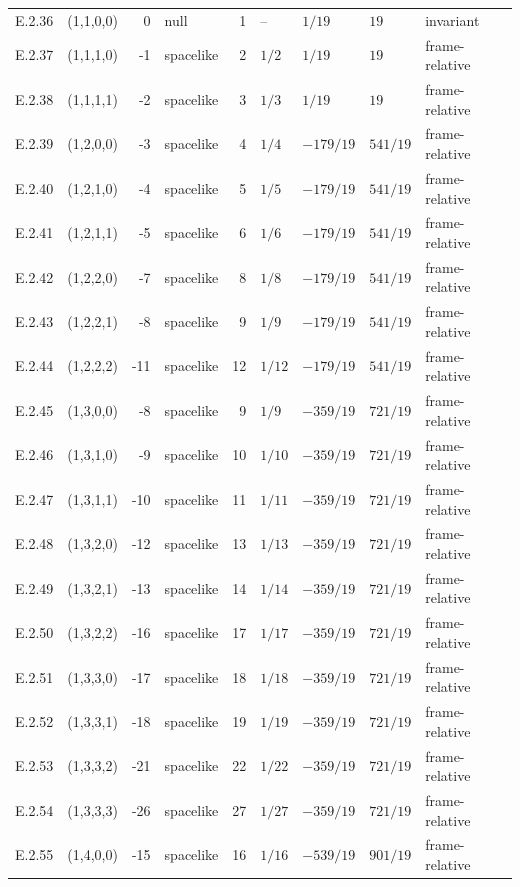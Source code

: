 {\begin{longtable}{@{}llrlrllll@{}}
E.2.36 & (1,1,0,0) & 0 & null & 1 & -- & $1/19$ & $19$ & invariant \\
E.2.37 & (1,1,1,0) & -1 & spacelike & 2 & $1/2$ & $1/19$ & $19$ & frame-relative \\
E.2.38 & (1,1,1,1) & -2 & spacelike & 3 & $1/3$ & $1/19$ & $19$ & frame-relative \\
E.2.39 & (1,2,0,0) & -3 & spacelike & 4 & $1/4$ & $-179/19$ & $541/19$ & frame-relative \\
E.2.40 & (1,2,1,0) & -4 & spacelike & 5 & $1/5$ & $-179/19$ & $541/19$ & frame-relative \\
E.2.41 & (1,2,1,1) & -5 & spacelike & 6 & $1/6$ & $-179/19$ & $541/19$ & frame-relative \\
E.2.42 & (1,2,2,0) & -7 & spacelike & 8 & $1/8$ & $-179/19$ & $541/19$ & frame-relative \\
E.2.43 & (1,2,2,1) & -8 & spacelike & 9 & $1/9$ & $-179/19$ & $541/19$ & frame-relative \\
E.2.44 & (1,2,2,2) & -11 & spacelike & 12 & $1/12$ & $-179/19$ & $541/19$ & frame-relative \\
E.2.45 & (1,3,0,0) & -8 & spacelike & 9 & $1/9$ & $-359/19$ & $721/19$ & frame-relative \\
E.2.46 & (1,3,1,0) & -9 & spacelike & 10 & $1/10$ & $-359/19$ & $721/19$ & frame-relative \\
E.2.47 & (1,3,1,1) & -10 & spacelike & 11 & $1/11$ & $-359/19$ & $721/19$ & frame-relative \\
E.2.48 & (1,3,2,0) & -12 & spacelike & 13 & $1/13$ & $-359/19$ & $721/19$ & frame-relative \\
E.2.49 & (1,3,2,1) & -13 & spacelike & 14 & $1/14$ & $-359/19$ & $721/19$ & frame-relative \\
E.2.50 & (1,3,2,2) & -16 & spacelike & 17 & $1/17$ & $-359/19$ & $721/19$ & frame-relative \\
E.2.51 & (1,3,3,0) & -17 & spacelike & 18 & $1/18$ & $-359/19$ & $721/19$ & frame-relative \\
E.2.52 & (1,3,3,1) & -18 & spacelike & 19 & $1/19$ & $-359/19$ & $721/19$ & frame-relative \\
E.2.53 & (1,3,3,2) & -21 & spacelike & 22 & $1/22$ & $-359/19$ & $721/19$ & frame-relative \\
E.2.54 & (1,3,3,3) & -26 & spacelike & 27 & $1/27$ & $-359/19$ & $721/19$ & frame-relative \\
E.2.55 & (1,4,0,0) & -15 & spacelike & 16 & $1/16$ & $-539/19$ & $901/19$ & frame-relative \\

\end{longtable}}

